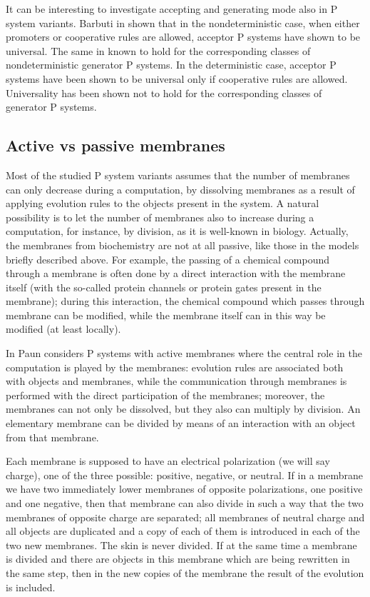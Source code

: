 It can be interesting to investigate accepting and generating mode also in P system variants. Barbuti in \cite{Barbuti:2010:AcceptingGenerating} shown that in the nondeterministic case, when either promoters or cooperative rules are allowed, acceptor P systems have shown to be universal. The same in known to hold for the corresponding classes of nondeterministic generator P systems. In the deterministic case, acceptor P systems have been shown to be universal only if cooperative rules are allowed. Universality has been shown not to hold for the corresponding classes of generator P systems.


\subsection{Active vs passive membranes} %
\label{sub:active_vs_passive_membranes}

Most of the studied P system variants assumes that the number of membranes can only decrease during a computation, by dissolving membranes as a result of applying evolution rules to the objects present in the system.
A natural possibility is to let the number of membranes also to increase during a computation, for instance, by division, as it is well-known in biology. Actually, the membranes from biochemistry are not at all passive, like those in the models briefly described above.
For example, the passing of a chemical compound through a membrane is often done by a direct interaction with the membrane itself (with the so-called protein channels or protein gates present in the membrane); during this interaction, the chemical compound which passes through membrane can be modified, while the membrane itself can in this way be modified (at least locally).

In \cite{Paun99ActiveMembranes} Paun considers P systems with active membranes where the central role in the computation is played by the membranes: evolution rules are associated both with objects and membranes, while the communication through membranes is performed with the direct participation of the membranes; moreover, the membranes can not only be dissolved, but they also can multiply by division. An elementary membrane can be divided by means of an interaction with an object from that membrane.


Each membrane is supposed to have an electrical polarization (we will say charge), one of the three possible: positive, negative, or neutral. If in a membrane we have two immediately lower membranes of opposite polarizations, one positive and one negative, then that membrane can also divide in such a way that the two membranes of opposite charge are separated; all membranes of neutral charge and all objects are duplicated and a copy of each of them is introduced in each of the two new membranes.
The skin is never divided.
If at the same time a membrane is divided and there are objects in this membrane which are being rewritten in the same step, then in the new copies of the membrane the result of the evolution is included.

